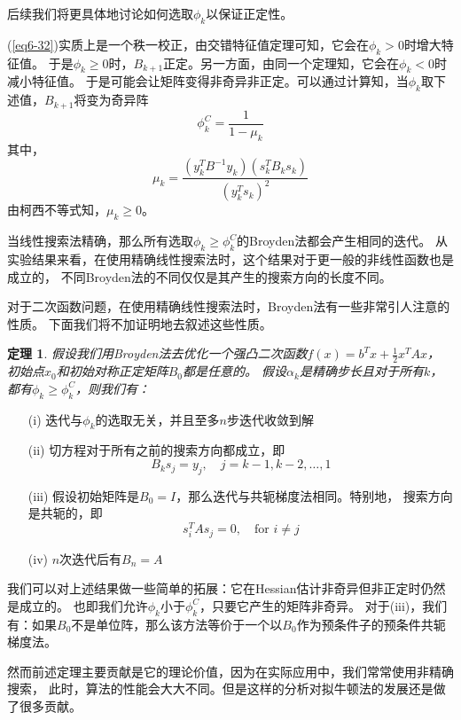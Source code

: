 \documentclass{article}
\newtheorem{thm}{定理}
\begin{document}
后续我们将更具体地讨论如何选取$\phi_k$以保证正定性。

(\ref{eq6-32})实质上是一个秩一校正，由交错特征值定理可知，它会在$\phi_k>0$时增大特征值。
于是$\phi_k\ge 0$时，$B_{k+1}$正定。另一方面，由同一个定理知，它会在$\phi_k<0$时减小特征值。
于是可能会让矩阵变得非奇异非正定。可以通过计算知，当$\phi_k$取下述值，$B_{k+1}$将变为奇异阵
\begin{equation}
  \label{eq6-37}
  \phi_k^C = \frac1{1-\mu_k}
\end{equation}
其中，
\begin{equation}
  \label{eq6-38}
  \mu_k = \frac{(y_k^TB^{-1}y_k)(s_k^TB_ks_k)}{(y_k^Ts_k)^2}
\end{equation}
由柯西不等式知，$\mu_k\ge0$。

当线性搜索法精确，那么所有选取$\phi_k\ge \phi_k^C$的Broyden法都会产生相同的迭代。
从实验结果来看，在使用精确线性搜索法时，这个结果对于更一般的非线性函数也是成立的，
不同Broyden法的不同仅仅是其产生的搜索方向的长度不同。

对于二次函数问题，在使用精确线性搜索法时，Broyden法有一些非常引人注意的性质。
下面我们将不加证明地去叙述这些性质。

\begin{thm}
  假设我们用Broyden法去优化一个强凸二次函数$f(x) = b^Tx + \frac12 x^TAx$，
  初始点$x_0$和初始对称正定矩阵$B_0$都是任意的。
  假设$\alpha_k$是精确步长且对于所有$k$，都有$\phi_k \ge \phi_k^C$，则我们有：
\end{thm}
\begin{itemize}
  \item [(i)] 迭代与$\phi_k$的选取无关，并且至多$n$步迭代收敛到解
  \item [(ii)] 切方程对于所有之前的搜索方向都成立，即
  \[
    B_k s_j = y_j,\quad j = k-1,k-2,\dots,1
  \]
  \item [(iii)] 假设初始矩阵是$B_0 = I$，那么迭代与共轭梯度法相同。特别地，
  搜索方向是共轭的，即
  \[
    s_i^T A s_j = 0,\quad \text{for }i\ne j
  \]
  \item [(iv)] $n$次迭代后有$B_n = A$
\end{itemize}

我们可以对上述结果做一些简单的拓展：它在Hessian估计非奇异但非正定时仍然是成立的。
也即我们允许$\phi_k$小于$\phi_k^C$，只要它产生的矩阵非奇异。
对于(iii)，我们有：如果$B_0$不是单位阵，那么该方法等价于一个以$B_0$作为预条件子的预条件共轭梯度法。

然而前述定理主要贡献是它的理论价值，因为在实际应用中，我们常常使用非精确搜索，
此时，算法的性能会大大不同。但是这样的分析对拟牛顿法的发展还是做了很多贡献。
\end{document}
